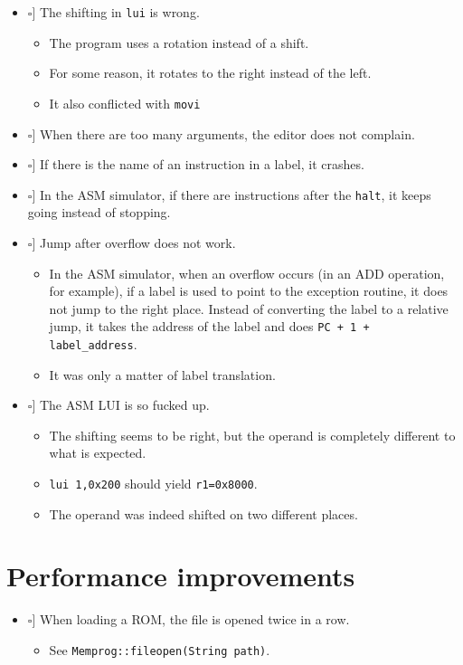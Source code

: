 \documentclass[12pt,a4paper]{extarticle}
\newcommand{\done}{\makebox[0pt][l]{$\square$}\raisebox{.15ex}{\hspace{0.1em}$\checkmark$}}%
\newcommand{\notdone}{\makebox[1em][l]{$\square$}}
\begin{document}
\begin{itemize}
  \item[\done] The shifting in \texttt{lui} is wrong.
    \begin{itemize}
      \item The program uses a rotation instead of a shift.
      \item For some reason, it rotates to the right instead of the left.
      \item It also conflicted with \texttt{movi}
    \end{itemize}

    \item[\notdone] When there are too many arguments, the editor does not complain.

    \item[\notdone] If there is the name of an instruction in a label, it crashes.

    \item[\notdone] In the ASM simulator, if there are instructions after the \texttt{halt}, it keeps going instead of stopping.

    \item[\done] Jump after overflow does not work.
    \begin{itemize}
      \item In the ASM simulator, when an overflow occurs (in an ADD operation, for example), if a label is used to point to the exception routine, it does not jump to the right place.
      Instead of converting the label to a relative jump, it takes the address of the label and does \verb|PC + 1 + label_address|.
      \item It was only a matter of label translation.
    \end{itemize}

    \item[\done] The ASM LUI is so fucked up.
    \begin{itemize}
      \item The shifting seems to be right, but the operand is completely different to what is expected.
      \item \texttt{lui 1,0x200} should yield \texttt{r1=0x8000}.
      \item The operand was indeed shifted on two different places.
    \end{itemize}



\end{itemize}

\section{Performance improvements}

\begin{itemize}
  \item[\notdone] When loading a ROM, the file is opened twice in a row.
    \begin{itemize}
      \item See \texttt{Memprog::fileopen(String path)}.
    \end{itemize}
  \end{itemize}
\end{document}
